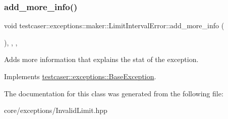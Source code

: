 \subsubsection{\texorpdfstring{add\_more\_info()}{add\_more\_info()}}
{\footnotesize\ttfamily void testcaser\+::exceptions\+::maker\+::\+Limit\+Interval\+Error\+::add\+\_\+more\+\_\+info (\begin{DoxyParamCaption}{ }\end{DoxyParamCaption})\hspace{0.3cm}{\ttfamily [inline]}, {\ttfamily [final]}, {\ttfamily [override]}, {\ttfamily [virtual]}}



Adds more information that explains the stat of the exception. 



Implements \mbox{\hyperlink{classtestcaser_1_1exceptions_1_1BaseException_ad607ea04e2cb4ad9b8d0e2e6b6734f2f}{testcaser\+::exceptions\+::\+Base\+Exception}}.



The documentation for this class was generated from the following file\+:\begin{DoxyCompactItemize}
\item 
core/exceptions/Invalid\+Limit.\+hpp\end{DoxyCompactItemize}
